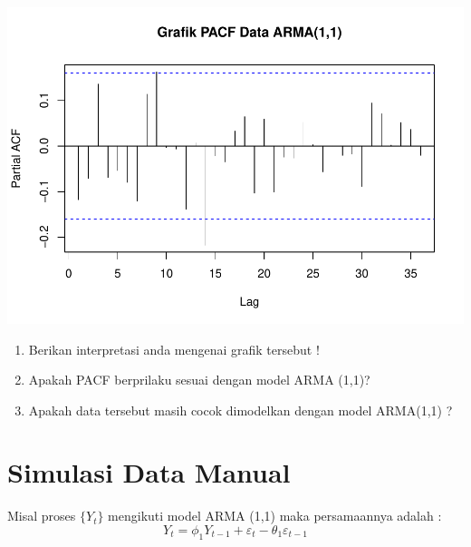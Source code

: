 \documentclass[
]{book}
\begin{document}
\begin{center}\includegraphics{_main_files/figure-latex/pacf ARMA-1} \end{center}
\begin{jp}{}{}
\begin{enumerate}
\item Berikan interpretasi anda mengenai grafik tersebut !  
\item Apakah PACF berprilaku sesuai dengan model ARMA (1,1)?
\item Apakah data tersebut masih cocok dimodelkan dengan model ARMA(1,1) ?
\end{enumerate}
\end{jp}

\hypertarget{simulasi-data-manual}{%
\section{Simulasi Data Manual}\label{simulasi-data-manual}}

Misal proses \(\{Y_t\}\) mengikuti model ARMA (1,1) maka persamaannya adalah :
\begin{equation}
Y_t=\phi_1 Y_{t-1}+\varepsilon_{t}-\theta_1 \varepsilon_{t-1}
\end{equation}
\end{document}
